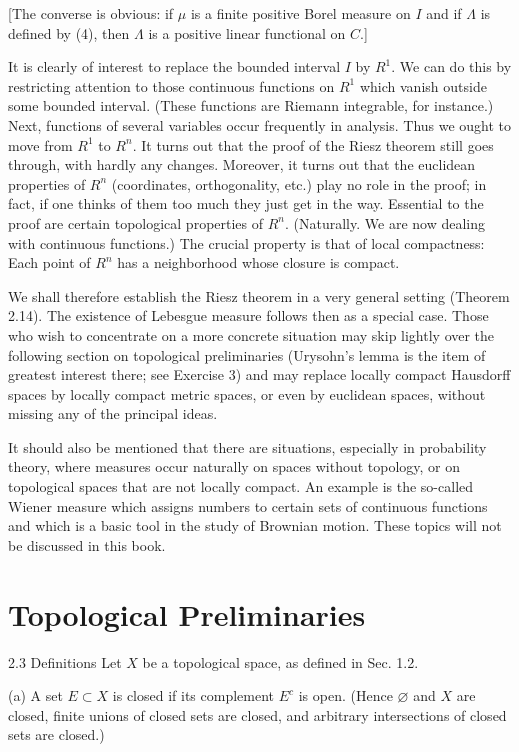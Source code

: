 \documentclass[10pt]{article}
\begin{document}
[The converse is obvious: if $\mu$ is a finite positive Borel measure on $I$ and if $\Lambda$ is defined by (4), then $\Lambda$ is a positive linear functional on $C$.]

It is clearly of interest to replace the bounded interval $I$ by $R^{1}$. We can do this by restricting attention to those continuous functions on $R^{1}$ which vanish outside some bounded interval. (These functions are Riemann integrable, for instance.) Next, functions of several variables occur frequently in analysis. Thus we ought to move from $R^{1}$ to $R^{n}$. It turns out that the proof of the Riesz theorem still goes through, with hardly any changes. Moreover, it turns out that the euclidean properties of $R^{n}$ (coordinates, orthogonality, etc.) play no role in the proof; in fact, if one thinks of them too much they just get in the way. Essential to the proof are certain topological properties of $R^{n}$. (Naturally. We are now dealing with continuous functions.) The crucial property is that of local compactness: Each point of $R^{n}$ has a neighborhood whose closure is compact.

We shall therefore establish the Riesz theorem in a very general setting (Theorem 2.14). The existence of Lebesgue measure follows then as a special case. Those who wish to concentrate on a more concrete situation may skip lightly over the following section on topological preliminaries (Urysohn's lemma is the item of greatest interest there; see Exercise 3) and may replace locally compact Hausdorff spaces by locally compact metric spaces, or even by euclidean spaces, without missing any of the principal ideas.

It should also be mentioned that there are situations, especially in probability theory, where measures occur naturally on spaces without topology, or on topological spaces that are not locally compact. An example is the so-called Wiener measure which assigns numbers to certain sets of continuous functions and which is a basic tool in the study of Brownian motion. These topics will not be discussed in this book.

\section{Topological Preliminaries}
2.3 Definitions Let $X$ be a topological space, as defined in Sec. 1.2.

(a) A set $E \subset X$ is closed if its complement $E^{c}$ is open. (Hence $\varnothing$ and $X$ are closed, finite unions of closed sets are closed, and arbitrary intersections of closed sets are closed.)
\end{document}

